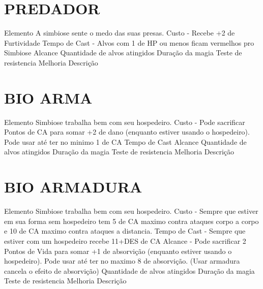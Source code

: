 \documentclass{article}%
\begin{document}
%
\section{PREDADOR}%
\label{sec:PREDADOR}%
Elemento A simbiose sente o medo das suas presas.\newline%
Custo {-} Recebe +2 de Furtividade\newline%
Tempo de Cast {-} Alvos com 1 de HP ou menos ficam vermelhos pro Simbiose\newline%
Alcance \newline%
Quantidade de alvos atingidos \newline%
Duração da magia \newline%
Teste de resistencia \newline%
Melhoria \newline%
Descrição \newline%

%
\section{BIO ARMA}%
\label{sec:BIOARMA}%
Elemento Simbiose trabalha bem com seu hospedeiro.\newline%
Custo {-} Pode sacrificar Pontos de CA para somar +2 de dano (enquanto estiver usando o hospedeiro). Pode usar até ter no minimo 1 de CA\newline%
Tempo de Cast \newline%
Alcance \newline%
Quantidade de alvos atingidos \newline%
Duração da magia \newline%
Teste de resistencia \newline%
Melhoria \newline%
Descrição \newline%

%
\section{BIO ARMADURA}%
\label{sec:BIOARMADURA}%
Elemento Simbiose trabalha bem com seu hospedeiro.\newline%
Custo {-} Sempre que estiver em sua forma sem hospedeiro tem 5 de CA maximo contra ataques corpo a corpo e 10 de CA maximo contra ataques a distancia.\newline%
Tempo de Cast {-} Sempre que estiver com um hospedeiro recebe 11+DES de CA\newline%
Alcance {-} Pode sacrificar 2 Pontos de Vida para somar +1 de absorvição (enquanto estiver usando o hospedeiro). Pode usar até ter no maximo 8 de absorvição. (Usar armadura cancela o efeito de absorvição)\newline%
Quantidade de alvos atingidos \newline%
Duração da magia \newline%
Teste de resistencia \newline%
Melhoria \newline%
Descrição \newline%

%
\vspace{1cm}%
\end{document}
